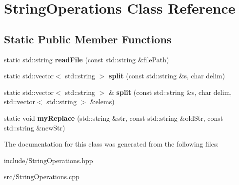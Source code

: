 \hypertarget{class_string_operations}{\section{String\-Operations Class Reference}
\label{class_string_operations}
}
\subsection*{Static Public Member Functions}
\begin{DoxyCompactItemize}
\item 
\hypertarget{class_string_operations_a5550c8f942f62b37ca945b5508b21934}{static std\-::string {\bfseries read\-File} (const std\-::string \&file\-Path)}\label{class_string_operations_a5550c8f942f62b37ca945b5508b21934}

\item 
\hypertarget{class_string_operations_a41c84cf589fc627f0f09548a5c6471a1}{static std\-::vector$<$ std\-::string $>$ {\bfseries split} (const std\-::string \&s, char delim)}\label{class_string_operations_a41c84cf589fc627f0f09548a5c6471a1}

\item 
\hypertarget{class_string_operations_a9c09f7c4bee513603d33f999de928a22}{static std\-::vector$<$ std\-::string $>$ \& {\bfseries split} (const std\-::string \&s, char delim, std\-::vector$<$ std\-::string $>$ \&elems)}\label{class_string_operations_a9c09f7c4bee513603d33f999de928a22}

\item 
\hypertarget{class_string_operations_a4e0c868d51287dfabd3c7f6396a1b6ae}{static void {\bfseries my\-Replace} (std\-::string \&str, const std\-::string \&old\-Str, const std\-::string \&new\-Str)}\label{class_string_operations_a4e0c868d51287dfabd3c7f6396a1b6ae}

\end{DoxyCompactItemize}


The documentation for this class was generated from the following files\-:\begin{DoxyCompactItemize}
\item 
include/String\-Operations.\-hpp\item 
src/String\-Operations.\-cpp\end{DoxyCompactItemize}
